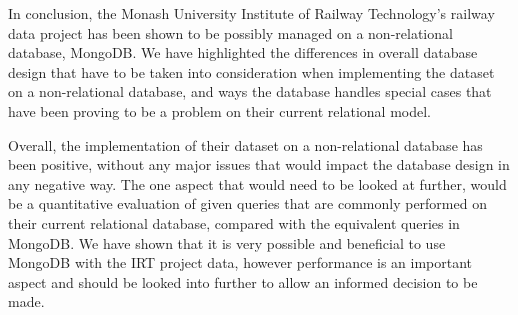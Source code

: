 \documentclass[a4paper,11pt]{article}
\begin{document}
In conclusion, the Monash University Institute of Railway Technology's railway data project has been shown to be possibly
managed on a non-relational database, MongoDB. We have highlighted the differences in overall database design that have
to be taken into consideration when implementing the dataset on a non-relational database, and ways the database
handles special cases that have been proving to be a problem on their current relational model.

Overall, the implementation of their dataset on a non-relational database has been positive, without any major issues that
would impact the database design in any negative way. The one aspect that would need to be looked at further, would be a
quantitative evaluation of given queries that are commonly performed on their current relational database, compared with
the equivalent queries in MongoDB. We have shown that it is very possible and beneficial to use MongoDB with the IRT
project data, however performance is an important aspect and should be looked into further to allow an informed decision
to be made.


\newpage                            %



\end{document}
